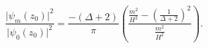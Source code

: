 \begin{equation}
\frac{\vert \psi_m(z_0) \vert^2}{\vert \psi_0(z_0) \vert^2}=
\frac{-(\Delta+2)}{\pi} \left(\frac{\frac{m^2}{H^2}-\left(\frac{1}{\Delta+2} \right)^2}
{\frac{m^2}{H^2}} \right).
\label{eq:ratio}
\end{equation}

